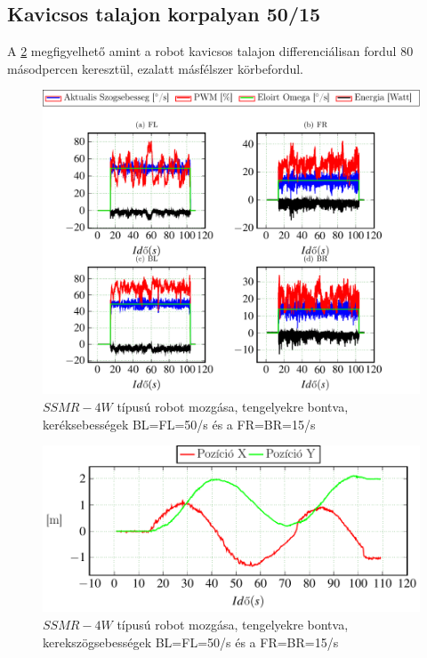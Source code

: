 \subsection{Kavicsos talajon korpalyan 50/15}
A \ref{fig:KorP0705a} megfigyelhető amint a robot kavicsos talajon differenciálisan fordul 80 másodpercen keresztül, ezalatt másfélszer körbefordul.

\renewcommand{\GlobalPath}{Meresek/Mozgasok/NormalMukodes/Korpalya_07_05_Kavicsos/}
\renewcommand{\secondImage}{*}

%

%

\begin{figure}[H]
  \includegraphics{tikz/KorP0705x.pdf}
  \caption{$SSMR-4W$ típusú robot mozgása, tengelyekre bontva, keréksebességek BL=FL=50\degree/s és a FR=BR=15\degree/s}
  \label{fig:KorP0705x}  
\end{figure}


\begin{figure}[H]
  \includegraphics{tikz/KorP0705a.pdf}
  \caption{$SSMR-4W$ típusú robot mozgása, tengelyekre bontva, kerekszögsebességek BL=FL=50\degree/s és a FR=BR=15\degree/s}
  \label{fig:KorP0705a}  
\end{figure}


